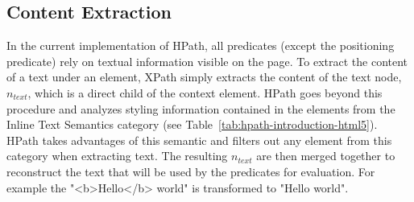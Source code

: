 \subsection{Content Extraction}
\label{sec:hpath-hpath-text-extraction}

In the current implementation of HPath, all predicates (except the positioning predicate) rely on textual information visible on the page. To extract the content of a text under an element, XPath simply extracts the content of the text node, $n_{text}$, which is a direct child of the context element. HPath goes beyond this procedure and analyzes styling information contained in the elements from the Inline Text Semantics category (see Table~\ref{tab:hpath-introduction-html5}). HPath takes advantages of this semantic and filters out any element from this category when extracting text. The resulting $n_{text}$ are then merged together to reconstruct the text that will be used by the predicates for evaluation. For example the "<b>Hello</b> world" is transformed to "Hello world".
